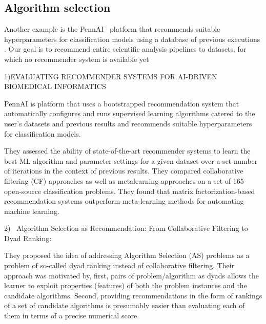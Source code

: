\documentclass[conference]{IEEEtran}
\begin{document}
\subsection{Algorithm selection}
    
    Another example is the PennAI~\cite{la2021evaluating} platform that recommends suitable hyperparameters for classification models using a database of  previous executions . Our goal is to recommend entire scientific analysis pipelines to datasets, for which no recommender system is available yet 

1)EVALUATING RECOMMENDER SYSTEMS FOR AI-DRIVEN
BIOMEDICAL INFORMATICS~\cite{la2021evaluating}

PennAI is platform that uses a bootstrapped recommendation system that automatically conﬁgures and runs supervised learning algorithms catered to the user’s datasets and previous results and recommends suitable hyperparameters for classification models.

They assessed the ability of state-of-the-art recommender systems to learn the best ML algorithm and parameter settings for a given dataset over a set number of iterations in the context of previous results. They compared collaborative ﬁltering (CF) approaches as well as metalearning  approaches on a set of 165 open-source classiﬁcation
problems. They found that matrix factorization-based recommendation systems outperform meta-learning methods for
automating machine learning.

2)~\cite{tornede2019algorithm}
Algorithm Selection as Recommendation: From Collaborative Filtering to Dyad Ranking:


They proposed the idea of addressing Algorithm Selection (AS) problems as a problem of so-called dyad ranking instead of collaborative filtering. Their approach was motivated by, first, pairs of problem/algorithm as dyads allows the learner
to exploit properties (features) of both the problem instances and the candidate algorithms. Second, providing recommendations in the form of rankings of a set of candidate algorithms is presumably easier than evaluating each of them in terms of a precise numerical score.
\end{document}
